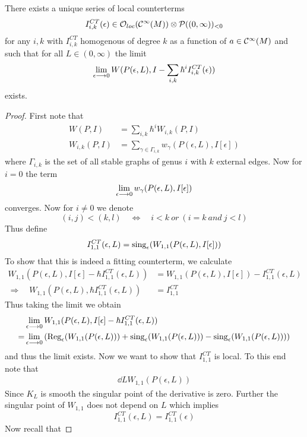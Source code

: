 \begin{theo}
  There exists a unique series of local counterterms
  $$ I_{i,k}^{CT}(\epsilon) \in \OO_{loc}(\Ci(M)) \otimes \mathcal{P}((0,\infty))_{<0} $$
  for any $i,k$ with $I_{i,k}^{CT}$ homogenous of degree $k$ as a function of $a \in \mathcal{C}^{\infty}(M)$ and such that for all $L \in (0,\infty)$ the limit
  $$ \lim_{\epsilon \lra 0} W(P(\epsilon, L), I - \sum_{i,k} \hbar^i I_{i,k}^{CT}(\epsilon)) $$
  exists.
\begin{proof}
  First note that
  \begin{align*}
    W(P,I) &= \sum_{i,k} \hbar^i W_{i,k}(P,I) \\
    W_{i,k}(P,I) &= \sum_{\gamma \in \Gamma_{i,k}} w_\gamma (P(\epsilon, L), I[\epsilon])
  \end{align*}
  where $\Gamma_{i,k}$ is the set of all stable graphs of genus $i$ with $k$ external edges. Now for $i = 0$ the term
  $$ \lim_{\epsilon \lra 0} w_\gamma (P(\epsilon, L), I[\epsilon])$$
  converges. Now for $i\neq 0$ we denote
  $$ (i,j) < (k,l) \quad \Leftrightarrow \quad i<k \ or \ (i=k \ and \ j<l) $$
  Thus define
  $$ I_{1,1}^{CT}(\epsilon, L) = \sing_\epsilon(W_{1,1}(P(\epsilon, L), I[\epsilon])) $$
  To show that this is indeed a fitting counterterm, we calculate
  \begin{align*}
    W_{1,1}(P(\epsilon,L), I[\epsilon] - \hbar I_{1,1}^{CT}(\epsilon,L)) &= W_{1,1}(P(\epsilon,L), I[\epsilon]) - I_{1,1}^{CT}(\epsilon,L)\\
    \Rightarrow \quad W_{1,1}(P(\epsilon,L), \hbar I_{1,1}^{CT}(\epsilon,L)) &= I_{1,1}^{CT}
  \end{align*}
  Thus taking the limit we obtain
  \begin{align*}
    &\lim_{\epsilon \lra 0} W_{1,1}(P(\epsilon,L), I[\epsilon] - \hbar I_{1,1}^{CT}(\epsilon,L)) \\
    = &\lim_{\epsilon \lra 0} \left( \Reg_\epsilon(W_{1,1}(P(\epsilon,L))) + \sing_\epsilon(W_{1,1}(P(\epsilon,L))) - \sing_\epsilon(W_{1,1}(P(\epsilon,L))) \right)
  \end{align*}
  and thus the limit exists. Now we want to show that $I_{1,1}^{CT}$ is local. To this end note that
  \begin{align*}
    \dd{}{L} W_{1,1}(P(\epsilon,L))
  \end{align*}
  Since $K_L$ is smooth the singular point of the derivative is zero. Further the singular point of $W_{1,1}$ does not depend on $L$ which implies
  $$ I_{1,1}^{CT}(\epsilon, L) = I_{1,1}^{CT}(\epsilon) $$
  Now recall that

\end{proof}
\end{theo}
